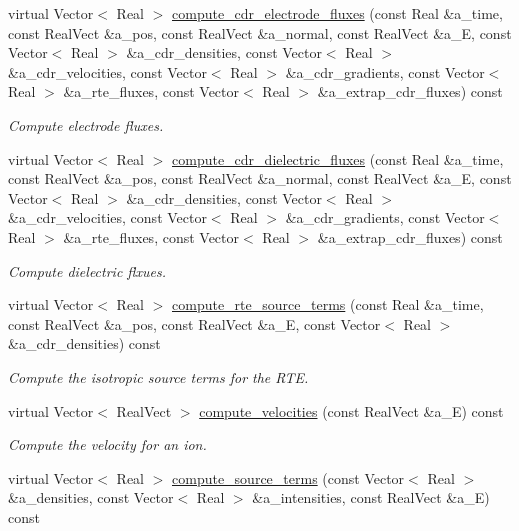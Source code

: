 \begin{DoxyCompactItemize}
virtual Vector$<$ Real $>$ \hyperlink{classmorrow__lowke_a022a1f95db250860f55de172370da47b}{compute\+\_\+cdr\+\_\+electrode\+\_\+fluxes} (const Real \&a\+\_\+time, const Real\+Vect \&a\+\_\+pos, const Real\+Vect \&a\+\_\+normal, const Real\+Vect \&a\+\_\+E, const Vector$<$ Real $>$ \&a\+\_\+cdr\+\_\+densities, const Vector$<$ Real $>$ \&a\+\_\+cdr\+\_\+velocities, const Vector$<$ Real $>$ \&a\+\_\+cdr\+\_\+gradients, const Vector$<$ Real $>$ \&a\+\_\+rte\+\_\+fluxes, const Vector$<$ Real $>$ \&a\+\_\+extrap\+\_\+cdr\+\_\+fluxes) const 
\begin{DoxyCompactList}\small\item\em Compute electrode fluxes. \end{DoxyCompactList}\item 
virtual Vector$<$ Real $>$ \hyperlink{classmorrow__lowke_afc69e466eb5c03ea64a2c17ca5aa4ae7}{compute\+\_\+cdr\+\_\+dielectric\+\_\+fluxes} (const Real \&a\+\_\+time, const Real\+Vect \&a\+\_\+pos, const Real\+Vect \&a\+\_\+normal, const Real\+Vect \&a\+\_\+E, const Vector$<$ Real $>$ \&a\+\_\+cdr\+\_\+densities, const Vector$<$ Real $>$ \&a\+\_\+cdr\+\_\+velocities, const Vector$<$ Real $>$ \&a\+\_\+cdr\+\_\+gradients, const Vector$<$ Real $>$ \&a\+\_\+rte\+\_\+fluxes, const Vector$<$ Real $>$ \&a\+\_\+extrap\+\_\+cdr\+\_\+fluxes) const 
\begin{DoxyCompactList}\small\item\em Compute dielectric flxues. \end{DoxyCompactList}\item 
virtual Vector$<$ Real $>$ \hyperlink{classmorrow__lowke_a8d14dafaccca6a622433f82f578cb7c7}{compute\+\_\+rte\+\_\+source\+\_\+terms} (const Real \&a\+\_\+time, const Real\+Vect \&a\+\_\+pos, const Real\+Vect \&a\+\_\+E, const Vector$<$ Real $>$ \&a\+\_\+cdr\+\_\+densities) const 
\begin{DoxyCompactList}\small\item\em Compute the isotropic source terms for the R\+TE. \end{DoxyCompactList}\item 
virtual Vector$<$ Real\+Vect $>$ \hyperlink{classmorrow__lowke_a6fd9a4cffca55dba0c3f8d371640e5d2}{compute\+\_\+velocities} (const Real\+Vect \&a\+\_\+E) const 
\begin{DoxyCompactList}\small\item\em Compute the velocity for an ion. \end{DoxyCompactList}\item 
virtual Vector$<$ Real $>$ \hyperlink{classmorrow__lowke_a988e38a2c96595a592a7c4e7813505ce}{compute\+\_\+source\+\_\+terms} (const Vector$<$ Real $>$ \&a\+\_\+densities, const Vector$<$ Real $>$ \&a\+\_\+intensities, const Real\+Vect \&a\+\_\+E) const 

\end{DoxyCompactItemize}
